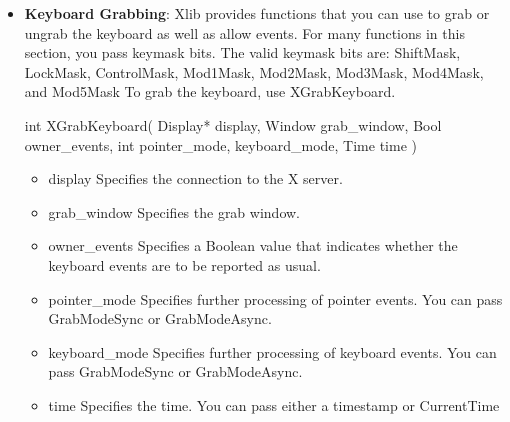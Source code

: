 \documentclass{report}
\begin{document}
\begin{itemize}
\begin{itemize}
                \item LockMask	(2)	Caps Lock
                \item ControlMask (4)	Ctrl
                \item Mod1Mask	(8)	Alt / Meta
                \item Mod2Mask	(16)	Num Lock
                \item Mod3Mask	(32)	Scroll Lock / AltGr
                \item Mod4Mask	(64)	Windows Key / Super
                \item Mod5Mask	(128)	AltGr / Scroll Lock
                \item AnyModifier	(32768)	Matches any modifier combination
            \end{itemize}
        \item \textbf{Keyboard Grabbing}: 
            Xlib provides functions that you can use to grab or ungrab the keyboard as well as allow events. For many functions in this section, you pass keymask bits. The valid keymask bits are: ShiftMask, LockMask, ControlMask, Mod1Mask, Mod2Mask, Mod3Mask, Mod4Mask, and Mod5Mask
            \bigbreak \noindent 
            To grab the keyboard, use XGrabKeyboard.
            \bigbreak \noindent 
            \begin{cppcode}
                int XGrabKeyboard(
                    Display* display,
                    Window grab_window,
                    Bool owner_events,
                    int pointer_mode, keyboard_mode,
                    Time time
                )
            \end{cppcode}
            \begin{itemize}
                \item display Specifies the connection to the X server.
                \item grab\_window Specifies the grab window.
                \item owner\_events Specifies a Boolean value that indicates whether the keyboard events are to be reported as usual.
                \item pointer\_mode Specifies further processing of pointer events. You can pass GrabModeSync or GrabModeAsync.
                \item keyboard\_mode Specifies further processing of keyboard events. You can pass GrabModeSync or GrabModeAsync.
                \item time Specifies the time. You can pass either a timestamp or CurrentTime

\end{itemize}
\end{itemize}
\end{document}
